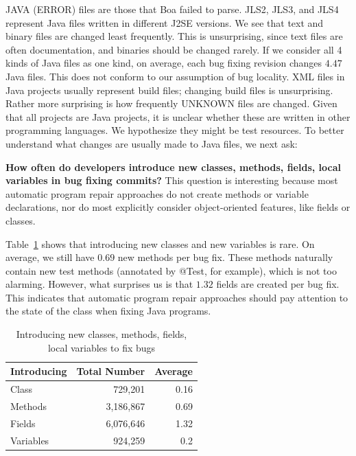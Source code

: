 \documentclass{sig-alternate-05-2015}
\begin{document}
JAVA (ERROR) files are those that Boa failed to parse. JLS2, JLS3, and JLS4
represent Java files written in different J2SE versions.  We see that text and
binary files are changed least frequently. This is unsurprising, since text
files are often documentation, and binaries should be changed rarely. If we
consider all 4 kinds of Java files as one kind, on average, each bug fixing
revision changes $4.47$ Java files. This does not conform to our assumption of
bug locality. XML files in Java projects usually represent build files;
changing build files is unsurprising.  Rather more surprising is how frequently
UNKNOWN files are changed. Given that all projects are Java projects, it is
unclear whether these are written in other programming languages. We
hypothesize they might be test resources.  To better understand what changes
are usually made to Java files, we next ask:

\vspace{1ex}
\noindent\textbf{How often do developers introduce new classes, methods, fields,
	local variables in
bug fixing commits?} 
%
This question is interesting because most automatic program repair approaches
do not create methods or variable declarations, nor do most explicitly consider
object-oriented features, like fields or classes. 

Table~\ref{tbl:new} shows that introducing new
classes and new variables is rare. On average, we still have $0.69$ new methods
per bug fix. These methods naturally contain new test methods (annotated by
@Test, for example), which is not too alarming. However,
what surprises us is that $1.32$ fields are created per bug fix.  This indicates
that automatic program repair approaches should pay attention to the state of
the class when fixing Java programs.

\begin{table}
\centering
  \begin{tabular}{l | r  r }
  \toprule
  Introducing & Total Number & Average \\ \midrule
  Class & 729,201 & 0.16 \\ 
  Methods & 3,186,867 & 0.69 \\ 
  Fields & 6,076,646 & 1.32 \\ 
  Variables & 924,259 & 0.2 \\ 
\bottomrule
  \end{tabular}
  \caption{Introducing new classes, methods, fields, local variables to fix bugs}
  \label{tbl:new}
\vspace{-0.5cm}
\end{table}
\end{document}
